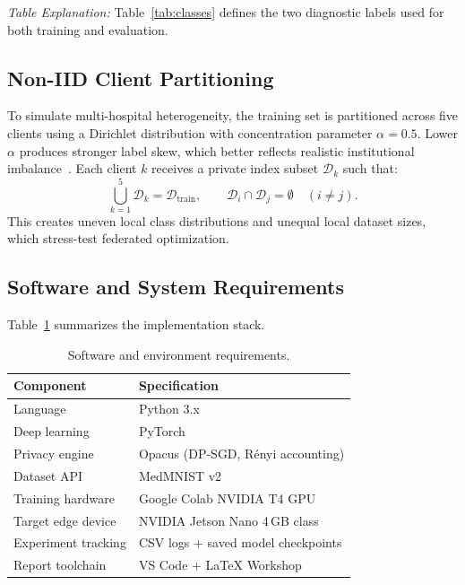 \noindent\emph{Table Explanation:} Table~\ref{tab:classes} defines the two
diagnostic labels used for both training and evaluation.
\FloatBarrier

\subsection{Non-IID Client Partitioning}
To simulate multi-hospital heterogeneity, the training set is partitioned
across five clients using a Dirichlet distribution with concentration
parameter $\alpha = 0.5$. Lower $\alpha$ produces stronger label skew, which
better reflects realistic institutional
imbalance~\cite{riyadi2026comparative,alekseenko2024distance}. Each client
$k$ receives a private index subset $\mathcal{D}_k$ such that:
\begin{equation}
\bigcup_{k=1}^{5} \mathcal{D}_k = \mathcal{D}_{\text{train}}, \qquad
\mathcal{D}_i \cap \mathcal{D}_j = \emptyset \quad (i \neq j).
\end{equation}
This creates uneven local class distributions and unequal local dataset
sizes, which stress-test federated optimization.

\subsection{Software and System Requirements}
Table~\ref{tab:software} summarizes the implementation stack.

\begin{table}[!htbp]
\centering
\caption{Software and environment requirements.}
\label{tab:software}
\small
\begin{tabular}{@{}ll@{}}
\toprule
\textbf{Component} & \textbf{Specification} \\
\midrule
Language              & Python 3.x \\
Deep learning         & PyTorch \\
Privacy engine        & Opacus (DP-SGD, R\'enyi accounting) \\
Dataset API           & MedMNIST v2 \\
Training hardware     & Google Colab NVIDIA T4 GPU \\
Target edge device    & NVIDIA Jetson Nano 4\,GB class \\
Experiment tracking   & CSV logs + saved model checkpoints \\
Report toolchain      & VS Code + LaTeX Workshop \\
\bottomrule
\end{tabular}
\end{table}

